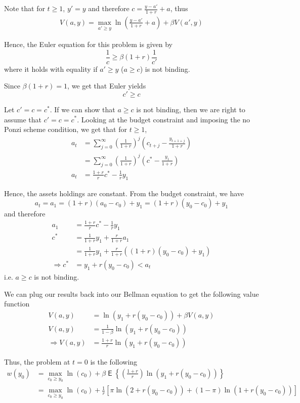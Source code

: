 \documentclass[12pt]{article}
\newcommand{\1}{{\bf 1}} %
\DeclareMathOperator{\E}{\mathsf{E}} %
\newcommand{\Ex}[1]{\E\left\{#1\right\}} %
\begin{document}
\begin{enumerate}[(1)]
	Note that for $t\geq 1$, $y'=y$ and therefore $c =\frac{y-a'}{1+r} +a$, thus
		\begin{align*}
	V(a,y)  =\max_{a'\geq y}\ln\left( \frac{y-a'}{1+r} +a\right)  +\beta V(a',y)
	\end{align*}
	
	Hence, the Euler equation for this problem is given by
	\[
	\frac{1}{c}\geq \beta (1+r)\frac{1}{c'}
	\]
	where it holds with equality if $a'\geq y$ ($a\geq c$) is not binding.
	
	Since $\beta(1+r)=1$, we get that Euler yields
	\[
	c'\geq c
	\]
	
	Let $c'=c=c^*$. If we can show that $a\geq c$ is not binding, then we are right to assume that $c'=c=c^*$. Looking at the budget constraint and imposing the no Ponzi scheme condition, we get that for $t\geq 1$,
	\begin{align*}
	a_t & = \sum_{j=0}^{\infty}\left( \frac{1}{1+r}\right)^j\left( c_{t+j} -\frac{y_{t+1+j}}{1+r} \right)  \\
	& = \sum_{j=0}^{\infty}\left( \frac{1}{1+r}\right)^j\left( c^* -\frac{y_{1}}{1+r} \right)  \\
	a_t & = \frac{1+r}{r} c^* -\frac{1}{r}y_1
	\end{align*}
	
	Hence, the assets holdings are constant. From the budget constraint, we have 
	\[
	a_t= a_1=(1+r)(a_0-c_0)+y_1=(1+r)(y_0-c_0)+y_1
	\]
	and therefore
		\begin{align*}
	a_1 & = \frac{1+r}{r} c^* -\frac{1}{r}y_1\\
	c^* & = \frac{1}{1+r}y_1 + \frac{r}{1+r}a_1\\
	& = \frac{1}{1+r}y_1 + \frac{r}{1+r}((1+r)(y_0-c_0)+y_1)\\
	\Rightarrow 	c^* & = y_1 + r(y_0-c_0)<a_t
	\end{align*}
	i.e.  $a\geq c$ is not binding.
	
	We can plug our results back into our Bellman equation to get the following value function
		\begin{align*}
V(a,y)  &=\ln\left( y_1 + r(y_0-c_0)\right)  +\beta V(a,y)\\
V(a,y) &= \frac{1}{1-\beta}\ln\left( y_1 + r(y_0-c_0)\right) \\
\Rightarrow V(a,y) &= \frac{1+r}{r}\ln\left( y_1 + r(y_0-c_0)\right)
\end{align*}

Thus, the problem at $t=0$ is the following
		\begin{align*}
w(y_0) &=\max_{c_0\geq y_0}\ln\left( c_0\right)  +\beta \Ex{\left( \frac{1+r}{r}\right) \ln\left( y_1 + r(y_0-c_0)\right)}\\
&=\max_{c_0\geq y_0}\ln\left( c_0\right)  + \frac{1}{r}\left[  \pi \ln\left( 2 + r(y_0-c_0)\right) +(1-\pi) \ln\left( 1 + r(y_0-c_0)\right)\right] \\
\end{align*}


\end{enumerate}
\end{document}
